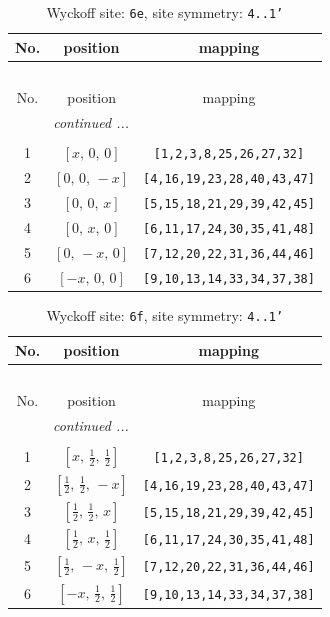 \documentclass[fleqn,8pt]{jsarticle}
\begin{document}
\renewcommand{\arraystretch}{1.2}
\begin{longtable}{ccc}
\caption{Wyckoff site: {\tt 6e}, site symmetry: {\tt 4..1'}}
 \\
 \hline \hline
No. & position & mapping \\ \hline \endfirsthead

\multicolumn{2}{l}{\tablename\ \thetable{}} \\
 \hline \hline
No. & position & mapping \\ \hline \endhead

 \hline \hline
\multicolumn{2}{r}{\footnotesize\it continued ...} \\ \endfoot

 \hline \hline
\multicolumn{2}{r}{} \\ \endlastfoot

1 & $\left[ x,\, 0,\, 0 \right]$ & {\tt [1,2,3,8,25,26,27,32]} \\ \hline
2 & $\left[ 0,\, 0,\, - x \right]$ & {\tt [4,16,19,23,28,40,43,47]} \\ \hline
3 & $\left[ 0,\, 0,\, x \right]$ & {\tt [5,15,18,21,29,39,42,45]} \\ \hline
4 & $\left[ 0,\, x,\, 0 \right]$ & {\tt [6,11,17,24,30,35,41,48]} \\ \hline
5 & $\left[ 0,\, - x,\, 0 \right]$ & {\tt [7,12,20,22,31,36,44,46]} \\ \hline
6 & $\left[ - x,\, 0,\, 0 \right]$ & {\tt [9,10,13,14,33,34,37,38]} \\
\end{longtable}
\renewcommand{\arraystretch}{1.2}
\begin{longtable}{ccc}
\caption{Wyckoff site: {\tt 6f}, site symmetry: {\tt 4..1'}}
 \\
 \hline \hline
No. & position & mapping \\ \hline \endfirsthead

\multicolumn{2}{l}{\tablename\ \thetable{}} \\
 \hline \hline
No. & position & mapping \\ \hline \endhead

 \hline \hline
\multicolumn{2}{r}{\footnotesize\it continued ...} \\ \endfoot

 \hline \hline
\multicolumn{2}{r}{} \\ \endlastfoot

1 & $\left[ x,\, \frac{1}{2},\, \frac{1}{2} \right]$ & {\tt [1,2,3,8,25,26,27,32]} \\ \hline
2 & $\left[ \frac{1}{2},\, \frac{1}{2},\, - x \right]$ & {\tt [4,16,19,23,28,40,43,47]} \\ \hline
3 & $\left[ \frac{1}{2},\, \frac{1}{2},\, x \right]$ & {\tt [5,15,18,21,29,39,42,45]} \\ \hline
4 & $\left[ \frac{1}{2},\, x,\, \frac{1}{2} \right]$ & {\tt [6,11,17,24,30,35,41,48]} \\ \hline
5 & $\left[ \frac{1}{2},\, - x,\, \frac{1}{2} \right]$ & {\tt [7,12,20,22,31,36,44,46]} \\ \hline
6 & $\left[ - x,\, \frac{1}{2},\, \frac{1}{2} \right]$ & {\tt [9,10,13,14,33,34,37,38]} \\
\end{longtable}
\end{document}
